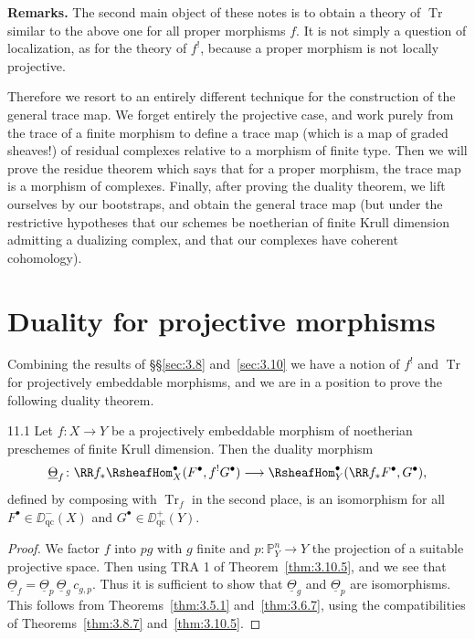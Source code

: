 \textbf{Remarks.}
The second main object of these notes is to obtain a theory of $\operatorname{Tr}$ similar to the above one for all proper morphisms $f$. It is not simply a question of localization, as for the theory of $f^!$, because a proper morphism is not locally projective.

Therefore we resort to an entirely different technique for the construction of the general trace map. We forget entirely the projective case, and work purely from the trace of a finite morphism to define a trace map (which is a map of graded sheaves!) of residual complexes relative to a morphism of finite type. Then we will prove the residue theorem which says that for a proper morphism, the trace map is a morphism of complexes. Finally, after proving the duality theorem, we lift ourselves by our bootstraps, and obtain the general trace map (but under the restrictive hypotheses that our schemes be noetherian of finite Krull dimension admitting a dualizing complex, and that our complexes have coherent cohomology).

\section{Duality for projective morphisms}\label{sec:3.11}

Combining the results of \S\S\ref{sec:3.8} and~\ref{sec:3.10} we have a notion of $f^!$ and $\operatorname{Tr}$ for projectively embeddable morphisms, and we are in a position to prove the following duality theorem.

\begin{booktheorem}{11.1}\label{thm:3.11.1}
Let $f\colon X\to Y$ be a projectively embeddable morphism of noetherian preschemes of finite Krull dimension. Then the duality morphism
\[
\underline{\Theta}_f \colon \RR f_* \RsheafHom_X^\bullet(F^\bullet, f^!G^\bullet) \longrightarrow \RsheafHom_Y^\bullet(\RR f_*F^\bullet, G^\bullet),
\]
defined by composing  with $\operatorname{Tr}_f$ in the second place, is an isomorphism for all $F^\bullet\in\DD_{\mathrm{qc}}^-(X)$ and $G^\bullet\in\DD_{\mathrm{qc}}^+(Y)$.
\end{booktheorem}

\begin{proof}
We factor $f$ into $pg$ with $g$ finite and $p\colon\mathbb{P}_Y^n\to Y$ the projection of a suitable projective space. Then using TRA 1 of Theorem~\ref{thm:3.10.5}, and  we see that $\underline{\Theta}_f=\underline{\Theta}_p\,\underline{\Theta}_g\,c_{g,p}$. Thus it is sufficient to show that $\underline{\Theta}_g$ and $\underline{\Theta}_p$ are isomorphisms. This follows from Theorems~\ref{thm:3.5.1} and~\ref{thm:3.6.7}, using the compatibilities of Theorems~\ref{thm:3.8.7} and~\ref{thm:3.10.5}.
\end{proof}

